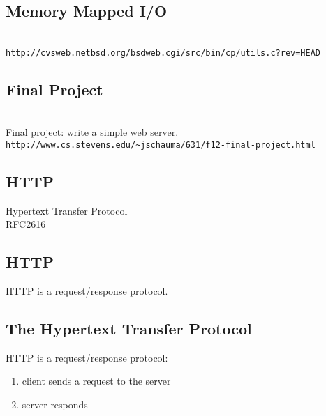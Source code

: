 \documentclass[xga]{xdvislides}
\begin{document}
\subsection{Memory Mapped I/O}
\\
\vspace*{\fill}
\verb+http://cvsweb.netbsd.org/bsdweb.cgi/src/bin/cp/utils.c?rev=HEAD+
\vspace*{\fill}

\subsection{Final Project}
\\
\vspace*{\fill}
Final project: write a simple web server. \\
{\tt http://www.cs.stevens.edu/\~{}jschauma/631/f12-final-project.html}
\vspace*{\fill}

\subsection{HTTP}
\vspace{.5in}
\begin{center}
	\Huge
	Hypertext Transfer Protocol
	\\
	\vspace{.5in}
	RFC2616
\end{center}
\Normalsize

\subsection{HTTP}
\vspace{.5in}
\begin{center}
	\Huge
	HTTP is a request/response protocol.
\end{center}
\Normalsize

\subsection{The Hypertext Transfer Protocol}
HTTP is a request/response protocol:
\begin{enumerate}
	\item client sends a request to the server
	\item server responds
\end{enumerate}
\end{document}
